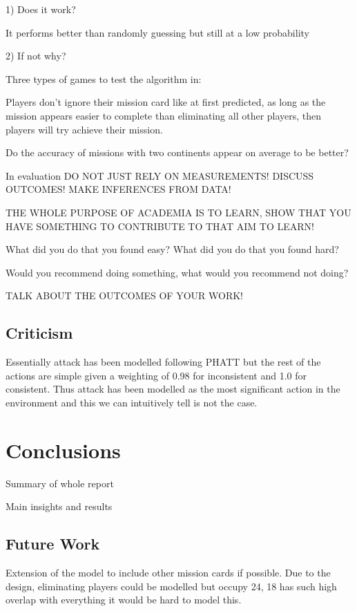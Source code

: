 \documentclass[parskip]{cs4rep}
\begin{document}
1) Does it work?

It performs better than randomly guessing but still at a low probability

2) If not why?

Three types of games to test the algorithm in:

Players don't ignore their mission card like at first predicted, as long as the mission appears easier to complete than eliminating all other players, then players will try achieve their mission.

Do the accuracy of missions with two continents appear on average to be better?

In evaluation DO NOT JUST RELY ON MEASUREMENTS! DISCUSS OUTCOMES! MAKE INFERENCES FROM DATA!

THE WHOLE PURPOSE OF ACADEMIA IS TO LEARN, SHOW THAT YOU HAVE SOMETHING TO CONTRIBUTE TO THAT AIM TO LEARN!

What did you do that you found easy? What did you do that you found hard? 

Would you recommend doing something, what would you recommend not doing?

TALK ABOUT THE OUTCOMES OF YOUR WORK!

\section{Criticism}

Essentially attack has been modelled following PHATT but the rest of the actions are simple given a weighting of 0.98 for inconsistent and 1.0 for consistent. Thus attack has been modelled as the most significant action in the environment and this we can intuitively tell is not the case.

\chapter{Conclusions}

Summary of whole report

Main insights and results

\section{Future Work}

Extension of the model to include other mission cards if possible. Due to the design, eliminating players could be modelled but occupy 24, 18 has such high overlap with everything it would be hard to model this.
\end{document}

